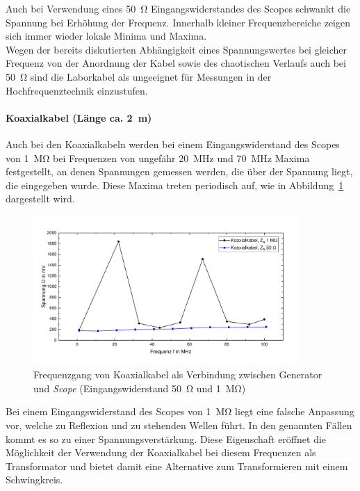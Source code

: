 \documentclass[a4paper,twoside,final]{article}
\begin{document}
Auch bei Verwendung eines \SI{50}{\ohm} Eingangswiderstandes des Scopes schwankt die Spannung bei Erhöhung der Frequenz. Innerhalb kleiner Frequenzbereiche zeigen sich immer wieder lokale Minima und Maxima.\\
Wegen der bereits diskutierten Abhängigkeit eines Spannungswertes bei gleicher Frequenz von der Anordnung der Kabel sowie des chaotischen Verlaufs auch bei \SI{50}{\ohm} sind die Laborkabel als ungeeignet für Messungen in der Hochfrequenztechnik einzustufen.

\paragraph{Koaxialkabel (Länge ca. \SI{2}{\metre})}
Auch bei den Koaxialkabeln werden bei einem Eingangswiderstand des Scopes von \SI{1}{\mega\ohm} bei Frequenzen von ungefähr \SI{20}{\mega\hertz} und \SI{70}{\mega\hertz} Maxima festgestellt, an denen Spannungen gemessen werden, die über der Spannung liegt, die eingegeben wurde. Diese Maxima treten periodisch auf, wie in Abbildung~\ref{fig:Frequenzverlauf_Koaxialkabel} dargestellt wird.
\begin{figure}[htp]
    \centering
    \vspace{-0.5cm}
        \includegraphics[width=0.9\textwidth]{Bilder/Koaxialkabel_50_1MOhm.pdf}
        \vspace{-0.25cm}
    \caption{Frequenzgang von Koaxialkabel als Verbindung zwischen Generator und \textit{Scope} (Eingangswiderstand \SI{50}{\ohm} und \SI{1}{\mega\ohm})}
    \label{fig:Frequenzverlauf_Koaxialkabel}
\end{figure}
Bei einem Eingangswiderstand des Scopes von \SI{1}{\mega\ohm} liegt eine falsche Anpassung vor, welche zu Reflexion und zu stehenden Wellen führt. In den genannten Fällen kommt es so zu einer Spannungsverstärkung. Diese Eigenschaft eröffnet die Möglichkeit der Verwendung der Koaxialkabel bei diesem Frequenzen als Transformator und bietet damit eine Alternative zum Transformieren mit einem Schwingkreis.
\end{document}
